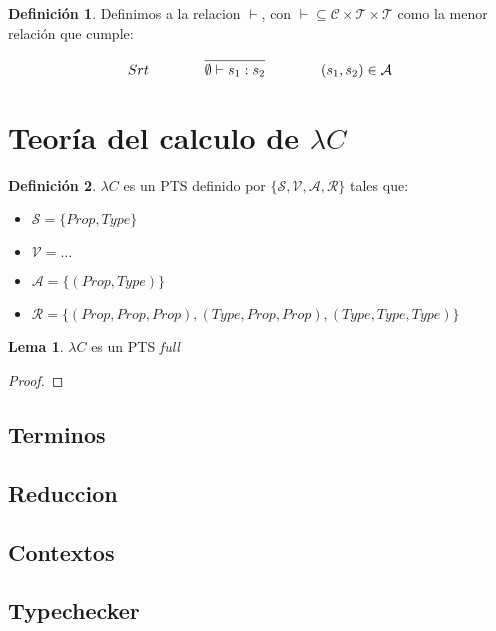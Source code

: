\documentclass{article}
\theoremstyle{definition}
\newtheorem{definition}{Definición}[section]
\newtheorem{lemma}[theorem]{Lema}
\theoremstyle{remark}
\begin{document}
\begin{definition}Definimos a la relacion $\vdash$, con $\vdash \subseteq \mathcal{C}\times\mathcal{T}\times\mathcal{T}$ como
la menor relación que cumple:

\begin{equation}
Srt\qquad\qquad\infer{\emptyset \vdash s_{1} : s_{2}}{}\qquad\qquad (s_{1},s_{2}) \in\mathcal{A}
\end{equation}
\end{definition}




\section{Teoría del calculo de $\lambda C$ }

\begin{definition}
$\lambda C$ es un PTS definido por $\{ \mathcal{S}, \mathcal{V}, \mathcal{A}, \mathcal{R}\}$ tales que:

\begin{itemize}
    \item{} $\mathcal{S} = \{Prop,Type\}$
    \item{} $\mathcal{V} = \dots $
    \item{} $\mathcal{A} = \{(Prop, Type)\}$
    \item{} $\mathcal{R} = \{(Prop, Prop, Prop), (Type, Prop, Prop), (Type, Type, Type)\}$
\end{itemize}

\end{definition}

\begin{lemma}
$\lambda C$ es un PTS \it{full}
\end{lemma}
\begin{proof}
\end{proof}


\subsection{Terminos}
\subsection{Reduccion}
\subsection{Contextos}
\subsection{Typechecker}
~\cite{Jutting93checkingalgorithms}
~\cite{Benthem:93}
~\cite{DBLP:conf/types/JuttingMP93}
\end{document}
